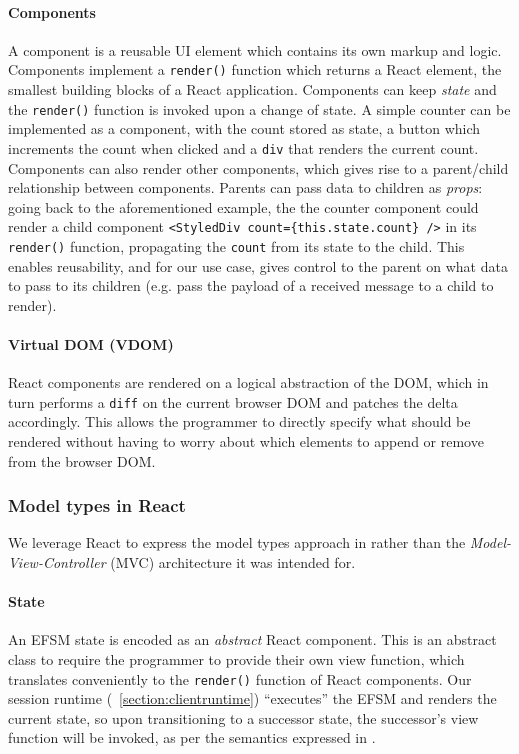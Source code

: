 \documentclass[submission,copyright,creativecommons]{eptcs}
\newcommand{\sectionref}[1]{\textsection~\ref{#1}}
\begin{document}
\paragraph{Components} A component is a reusable UI element which contains its own markup and logic. Components implement a \texttt{render()} function which returns a React element, the smallest building blocks of a React application. Components can keep \textit{state} and the \texttt{render()} function is invoked upon a change of state. A simple counter can be implemented as a component, with the count stored as state, a button which increments the count when clicked and a \texttt{div} that renders the current count. Components can also render other components, which gives rise to a parent/child relationship between components. Parents can pass data to children as \textit{props}: going back to the aforementioned example, the the counter component could render a child component \texttt{<StyledDiv count=\{this.state.count\} />} in its \texttt{render()} function, propagating the \texttt{count} from its state to the child. This enables reusability, and for our use case, gives control to the parent on what data to pass to its children (e.g. pass the payload of a received message to a child to render).

\paragraph{Virtual DOM (VDOM)} React components are rendered on a logical abstraction of the DOM, which in turn performs a \texttt{diff} on the current browser DOM and patches the delta accordingly. This allows the programmer to directly specify what should be rendered without having to worry about which elements to append or remove from the browser DOM.

\subsubsection{Model types in React}
We leverage React to express the model types approach in \cite{MVU2019} rather than the \textit{Model-View-Controller} (MVC) architecture it was intended for. 

\paragraph{State} An EFSM state is encoded as an \textit{abstract} React component. This is an abstract class to require the programmer to provide their own view function, which translates conveniently to the \texttt{render()} function of React components. Our session runtime (\sectionref{section:clientruntime}) ``executes'' the EFSM and renders the current state, so upon transitioning to a successor state, the successor's view function will be invoked, as per the semantics expressed in \cite{MVU2019}.
\end{document}

